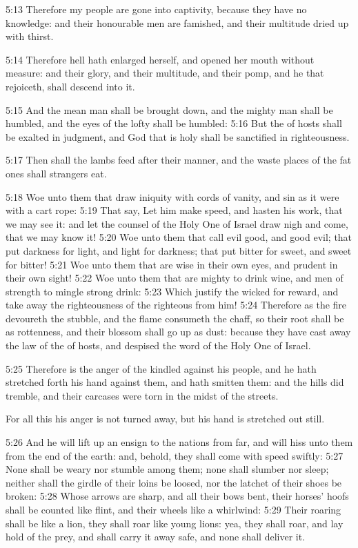 5:13 Therefore my people are gone into captivity, because they have no knowledge: and their honourable men are famished, and their multitude dried up with thirst.

5:14 Therefore hell hath enlarged herself, and opened her mouth without measure: and their glory, and their multitude, and their pomp, and he that rejoiceth, shall descend into it.

5:15 And the mean man shall be brought down, and the mighty man shall be humbled, and the eyes of the lofty shall be humbled: 5:16 But the \LORD of hosts shall be exalted in judgment, and God that is holy shall be sanctified in righteousness.

5:17 Then shall the lambs feed after their manner, and the waste places of the fat ones shall strangers eat.

5:18 Woe unto them that draw iniquity with cords of vanity, and sin as it were with a cart rope: 5:19 That say, Let him make speed, and hasten his work, that we may see it: and let the counsel of the Holy One of Israel draw nigh and come, that we may know it!  5:20 Woe unto them that call evil good, and good evil; that put darkness for light, and light for darkness; that put bitter for sweet, and sweet for bitter!  5:21 Woe unto them that are wise in their own eyes, and prudent in their own sight!  5:22 Woe unto them that are mighty to drink wine, and men of strength to mingle strong drink: 5:23 Which justify the wicked for reward, and take away the righteousness of the righteous from him!  5:24 Therefore as the fire devoureth the stubble, and the flame consumeth the chaff, so their root shall be as rottenness, and their blossom shall go up as dust: because they have cast away the law of the \LORD of hosts, and despised the word of the Holy One of Israel.

5:25 Therefore is the anger of the \LORD kindled against his people, and he hath stretched forth his hand against them, and hath smitten them: and the hills did tremble, and their carcases were torn in the midst of the streets.

For all this his anger is not turned away, but his hand is stretched out still.

5:26 And he will lift up an ensign to the nations from far, and will hiss unto them from the end of the earth: and, behold, they shall come with speed swiftly: 5:27 None shall be weary nor stumble among them; none shall slumber nor sleep; neither shall the girdle of their loins be loosed, nor the latchet of their shoes be broken: 5:28 Whose arrows are sharp, and all their bows bent, their horses' hoofs shall be counted like flint, and their wheels like a whirlwind: 5:29 Their roaring shall be like a lion, they shall roar like young lions: yea, they shall roar, and lay hold of the prey, and shall carry it away safe, and none shall deliver it.

